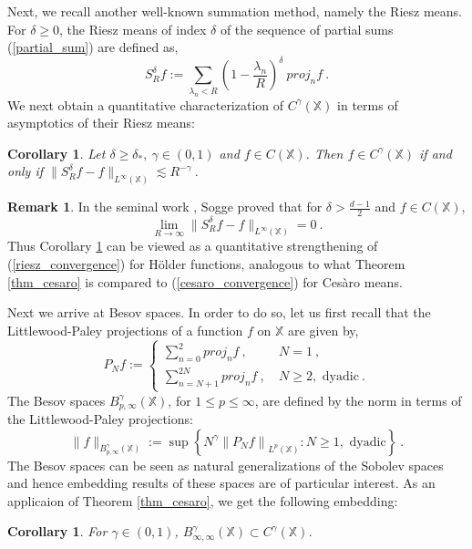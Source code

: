 \documentclass[12pt]{amsart}
\newtheorem{corollary}[theorem]{Corollary}
\theoremstyle{definition}
\newtheorem{remark}[theorem]{Remark}
\newcommand{\X}{\mathbb X}%
\numberwithin{equation}{section}
\begin{document}
Next, we recall another well-known summation method, namely the Riesz means. For $\delta \ge 0$, the Riesz means of index $\delta$ of the sequence of partial sums (\ref{partial_sum}) are defined as,
\begin{equation*}
S^{\delta}_Rf:= \sum_{\lambda_n <R} \left(1-\frac{\lambda_n}{R}\right)^\delta \:proj_nf \:.
\end{equation*}
We next obtain a quantitative characterization of $C^\gamma(\X)$ in terms of asymptotics of their Riesz means:
\begin{corollary} \label{corollary2}
Let $\delta \ge \delta_*,\:\gamma \in (0,1)$ and $f \in C(\X)$. Then $f \in C^\gamma(\X)$ if and only if $\|S^\delta_Rf-f\|_{L^\infty(\X)} \lesssim R^{-\gamma}\:.$
\end{corollary}

\begin{remark} \label{riesz_remark}
In the seminal work \cite{Sogge}, Sogge proved that for $\delta > \frac{d-1}{2}$ and $f \in C(\X)$, 
\begin{equation} \label{riesz_convergence}
\lim_{R \to \infty} \|S^\delta_Rf-f\|_{L^\infty(\X)}=0\:.
\end{equation} 
Thus Corollary \ref{corollary2} can be viewed as a quantitative strengthening of (\ref{riesz_convergence}) for H\"older functions, analogous to what Theorem \ref{thm_cesaro} is compared to (\ref{cesaro_convergence}) for Ces\`aro means.
\end{remark}
  
Next we arrive at Besov spaces. In order to do so, let us first recall that the Littlewood-Paley projections of a function $f$ on $\X$ are given by,
\begin{equation*}
P_Nf:=
\begin{cases}
	 \displaystyle\sum_{n=0}^2  proj_nf\:,\:& N=1\:,\\
	 \displaystyle\sum_{n=N+1}^{2N} proj_nf\:,\:&N\ge 2, \text{ dyadic}\:.
	\end{cases}
\end{equation*}
The Besov spaces $B^\gamma_{p,\infty}(\X)$, for $1 \le p \le \infty$, are defined by the norm in terms of the Littlewood-Paley projections:
\begin{equation} \label{besov_space}
\|f\|_{B^\gamma_{p,\infty}(\X)}:=\sup \left\{N^\gamma\left\|P_Nf\right\|_{L^p(\X)} : N\ge 1, \text{ dyadic}\right\}\:.
\end{equation}
The Besov spaces can be seen as natural generalizations of the Sobolev spaces and hence embedding results of these spaces are of particular interest. 
As an applicaion of Theorem \ref{thm_cesaro}, we get the following embedding:
\begin{corollary} \label{corollary3}
For $\gamma \in (0,1)$, $B^\gamma_{\infty,\infty}(\X) \subset C^\gamma(\X)$\:.
\end{corollary}
\end{document}
